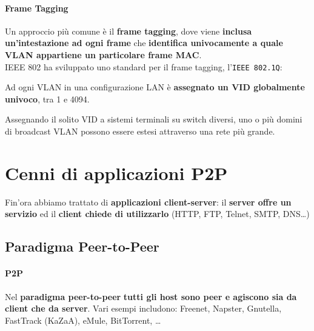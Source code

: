 \documentclass[10pt]{article}
\begin{document}
\paragraph{Frame Tagging} Un approccio più comune è il \textbf{frame tagging}, dove viene \textbf{inclusa un'intestazione ad ogni frame} che \textbf{identifica univocamente a quale VLAN appartiene un particolare frame MAC}.\\
IEEE 802 ha sviluppato uno standard per il frame tagging, l'\texttt{IEEE 802.1Q}:
\begin{list}{}{}
	\item Ad ogni VLAN in una configurazione LAN è \textbf{assegnato un VID globalmente univoco}, tra 1 e 4094.
	\item Assegnando il solito VID a sistemi terminali su switch diversi, uno o più domini di broadcast VLAN possono essere estesi attraverso una rete più grande.
\end{list}
\section{Cenni di applicazioni P2P}
Fin'ora abbiamo trattato di \textbf{applicazioni client-server}: il \textbf{server offre un servizio} ed il \textbf{client chiede di utilizzarlo} (HTTP, FTP, Telnet, SMTP, DNS\ldots)
\subsection{Paradigma Peer-to-Peer}
\paragraph{P2P} Nel \textbf{paradigma peer-to-peer} \textbf{tutti gli host sono peer e agiscono sia da client che da server}. Vari esempi includono: Freenet, Napster, Gnutella, FastTrack (KaZaA), eMule, BitTorrent, \ldots
\end{document}
